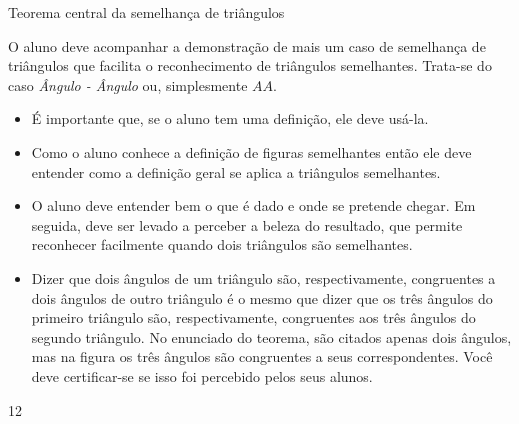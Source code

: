 \begin{sugestions}{Teorema central da semelhança de triângulos}
{O aluno deve acompanhar a demonstração de mais um caso de semelhança de triângulos que facilita o reconhecimento de triângulos semelhantes. Trata-se do caso \textit{Ângulo - Ângulo} ou, simplesmente \(AA\).

\begin{itemize}
\item {} 
É importante que, se o aluno tem uma definição, ele deve usá-la.

\item {} 
Como o aluno conhece a definição de figuras semelhantes então ele deve entender como a definição geral se aplica a triângulos semelhantes.

\item {} 
O aluno deve entender bem o que é dado e onde se pretende chegar. Em seguida, deve ser levado a perceber a beleza do resultado, que permite reconhecer facilmente quando dois triângulos são semelhantes.

\item {} 
Dizer que dois ângulos de um triângulo são, respectivamente, congruentes a dois ângulos de outro triângulo é o mesmo que dizer que os três ângulos do primeiro triângulo são, respectivamente, congruentes aos três ângulos do segundo triângulo. No enunciado do teorema, são citados apenas dois ângulos, mas na figura os três ângulos são congruentes a seus correspondentes. Você deve certificar-se se isso foi percebido pelos seus alunos.
\end{itemize}}
{1}{2}
\end{sugestions}
\clearmargin
